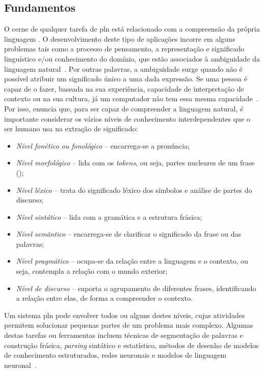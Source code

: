 \subsection{Fundamentos}
O cerne de qualquer tarefa de \gls{pln} está relacionado com a compreensão da própria linguagem \parencite{nlp}. O desenvolvimento deste tipo de aplicações incorre em alguns problemas tais como a processo de pensamento, a representação e significado linguístico e/ou conhecimento do domínio, que estão associados à ambiguidade da linguagem natural~\parencite{nlp, pln_extracao_conhecimento}. Por outras palavras, a ambiguidade surge quando não é possível atribuir um significado único a uma dada expressão. Se uma pessoa é capaz de o fazer, baseada na sua experiência, capacidade de interpretação de contexto ou na sua cultura, já um computador não tem essa mesma capacidade~\parencite{pln_extracao_conhecimento}. Por isso, \textcite{nlp} enuncia que, para ser capaz de compreender a linguagem natural, é importante considerar os vários níveis de conhecimento interdependentes que o ser humano usa na extração de significado:

\begin{itemize}
    \item 
    {
        \textit{Nível fonético ou fonológico} -- encarrega-se a pronúncia;
    }
    \item
    {
        \textit{Nível morfológico} -- lida com os \textit{tokens}, ou seja, partes nucleares de um frase ();
    }
    \item
    {
        \textit{Nível léxico} -- trata do significado léxico dos símbolos e análise de partes do discurso;
    }
    \item 
    {
        \textit{Nível sintático} -- lida com a gramática e a estrutura frásica;
    }
    \item
    {
        \textit{Nível semântico} -- encarrega-se de clarificar o significado da frase ou das palavras;
    }
    \item
    {
        \textit{Nível pragmático} -- ocupa-se da relação entre a linguagem e o contexto, ou seja, contempla a relação com o mundo exterior;
    }
    \item
    {
        \textit{Nível de discurso} -- suporta o agrupamento de diferentes frases, identificando a relação entre elas, de forma a compreender o contexto.
    }
\end{itemize}

Um sistema \gls{pln} pode envolver todos ou alguns destes níveis, cujas atividades permitem solucionar pequenas partes de um problema mais complexo. Algumas destas tarefas ou ferramentas incluem técnicas de segmentação de palavras e construção frásica, \textit{parsing} sintático e estatístico, métodos de desenho de modelos de conhecimento estruturados, redes neuronais e modelos de linguagem neuronal~\parencite{nlp, speech_language_processing}.

